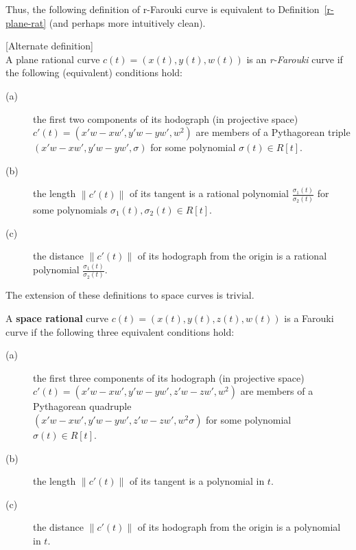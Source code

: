 Thus, the following definition of r-Farouki curve is equivalent
to Definition~\ref{r-plane-rat} (and perhaps more intuitively clean).

\begin{dfn}
\label{r-plane-rat-alt}
[Alternate definition] \\
A plane rational curve $c(t) = (x(t),y(t),w(t))$
is an {\em r-Farouki} curve if the following (equivalent) conditions hold:
\begin{description}
\item[(a)]
	the first two components of its hodograph (in projective space)\\
	$c'(t) = (x'w - xw', y'w - yw', w^2)$
	are members of a Pythagorean triple \\
	$(x'w - xw', y'w - yw', \sigma)$
	for some polynomial $\sigma(t) \in R[t]$.
\item[(b)]
	the length $\| c'(t) \|$ of its tangent is a rational polynomial 
	$\frac{\sigma_1(t)}{\sigma_2(t)}$ for some polynomials
	$\sigma_1(t),\sigma_2(t) \in R[t]$.
\item[(c)]
	the distance $\| c'(t) \|$ of its hodograph from the origin
	is a rational polynomial $\frac{\sigma_1(t)}{\sigma_2(t)}$. 
\end{description}
\end{dfn}

The extension of these definitions to space curves is trivial.

\begin{dfn}
A {\bf space rational} curve $c(t) = (x(t),y(t),z(t),w(t))$
is a Farouki curve if the following three equivalent conditions hold:
\begin{description}
\item[(a)]
	the first three components of its hodograph (in projective space)\\
	$c'(t) = (x'w - xw', y'w - yw', z'w - zw', w^2)$
	are members of a Pythagorean quadruple \\
	$(x'w - xw', y'w - yw', z'w - zw', w^2 \sigma)$
	for some polynomial $\sigma(t) \in R[t]$.
\item[(b)]
	the length $\| c'(t) \|$ of its tangent is a polynomial in $t$.
\item[(c)]
	the distance $\| c'(t) \|$ of its hodograph from the origin
	is a polynomial in $t$.
\end{description}
\end{dfn}

